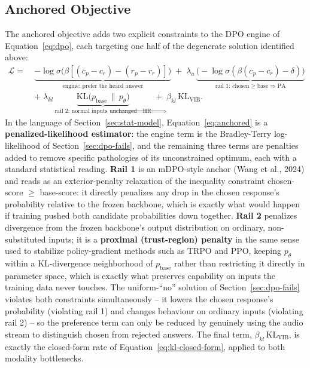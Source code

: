 \documentclass[11pt,a4paper,oneside]{article}
\begin{document}
\subsection{Anchored Objective}
\label{sec:objective}

The anchored objective adds two explicit constraints to the DPO engine of Equation~\eqref{eq:dpo},
each targeting one half of the degenerate solution identified above:
\begin{align}
\mathcal L =\ & \underbrace{-\log\sigma\big(\beta[(c_p{-}c_r){-}(r_p{-}r_r)]\big)}_{\text{engine: prefer the heard answer}}
 \;+\; \lambda_a\,\underbrace{\big({-}\log\sigma(\beta(c_p{-}c_r){-}\delta)\big)}_{\text{rail 1: chosen} \ge \text{base} \Rightarrow \text{PA}} \nonumber\\[2pt]
 &+\; \lambda_{kl}\,\underbrace{\mathrm{KL}\!\big(p_{\text{base}}\,\|\,p_\theta\big)}_{\text{rail 2: normal inputs unchanged} \Rightarrow \text{HR}}
 \;+\; \beta_{kl}\,\mathrm{KL}_{\text{VIB}}.
\label{eq:anchored}
\end{align}
In the language of Section~\ref{sec:stat-model}, Equation~\eqref{eq:anchored} is a
\textbf{penalized-likelihood estimator}: the engine term is the Bradley-Terry log-likelihood of
Section~\ref{sec:dpo-fails}, and the remaining three terms are penalties added to remove specific
pathologies of its unconstrained optimum, each with a standard statistical reading. \textbf{Rail 1}
is an mDPO-style anchor (Wang et al., 2024) and reads as an exterior-penalty relaxation of the
inequality constraint chosen-score $\ge$ base-score: it directly penalizes any drop in the chosen
response's probability relative to the frozen backbone, which is exactly what would happen if
training pushed both candidate probabilities down together. \textbf{Rail 2} penalizes divergence
from the frozen backbone's output distribution on ordinary, non-substituted inputs; it is a
\textbf{proximal (trust-region) penalty} in the same sense used to stabilize policy-gradient methods
such as TRPO and PPO, keeping $p_\theta$ within a KL-divergence neighborhood of $p_{\text{base}}$
rather than restricting it directly in parameter space, which is exactly what preserves capability on
inputs the training data never touches. The uniform-``no'' solution of
Section~\ref{sec:dpo-fails} violates both constraints simultaneously -- it lowers the chosen
response's probability (violating rail 1) and changes behaviour on ordinary inputs (violating rail 2)
-- so the preference term can only be reduced by genuinely using the audio stream to distinguish
chosen from rejected answers. The final term, $\beta_{kl}\,\mathrm{KL}_{\text{VIB}}$, is exactly the
closed-form rate of Equation~\eqref{eq:kl-closed-form}, applied to both modality bottlenecks.
\end{document}
